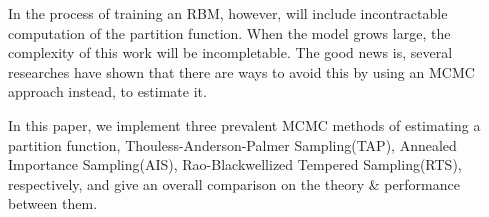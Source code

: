 In the process of training an RBM, however, will include incontractable computation of the partition function. When the model grows large, the complexity of this work will be incompletable. The good news is, several researches have shown that there are ways to avoid this by using an MCMC approach instead, to estimate it.

In this paper, we implement three prevalent MCMC methods of estimating a partition function, Thouless-Anderson-Palmer Sampling(TAP)\cite{gabrie2015training}, Annealed Importance Sampling(AIS)\cite{neal2001annealed,salakhutdinov2009learning}, Rao-Blackwellized Tempered Sampling(RTS)\cite{carlson2016partition}, respectively, and give an overall comparison on the theory \& performance between them.




